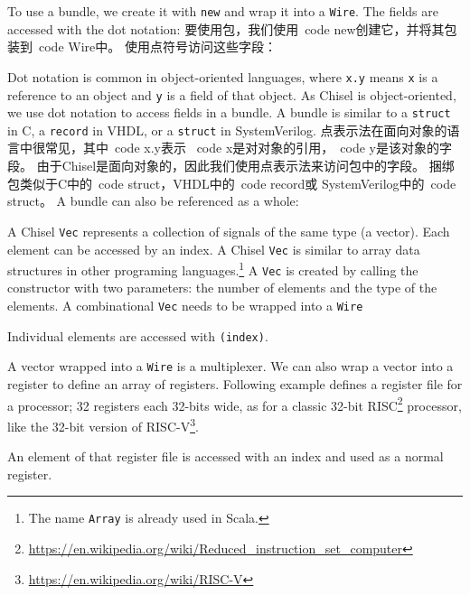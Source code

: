 \documentclass[%
    10pt,
    headinclude, footexclude,
    openright, %
    notitlepage,
    cleardoubleempty,
    headsepline,
    pointlessnumbers,
    bibtotoc, idxtotoc,
    ]{scrbook}
\newcommand{\code}[1]{{\small{\texttt{#1}}}}
\newcommand{\codefoot}[1]{{\footnotesize{\texttt{#1}}}}
\newcommand{\myref}[2]{\href{#1}{#2}}
\renewcommand{\myref}[2]{{#2}{\footnote{\url{#1}}}}
\begin{document}
\noindent To use a bundle, we create it with \code{new} and wrap it into a \code{Wire}.
The fields are accessed with the dot notation:
要使用包，我们使用\ code {new}创建它，并将其包装到\ code {Wire}中。
使用点符号访问这些字段：


Dot notation is common in object-oriented languages, where \code{x.y} means
\code{x} is a reference to an object and \code{y} is a field of that object.
As Chisel is object-oriented, we use dot notation to access fields in a bundle.
A bundle is similar to a \code{struct} in C, a \code{record} in VHDL, or a
\code{struct} in SystemVerilog.
点表示法在面向对象的语言中很常见，其中\ code {x.y}表示
\ code {x}是对对象的引用，\ code {y}是该对象的字段。
由于Chisel是面向对象的，因此我们使用点表示法来访问包中的字段。
捆绑包类似于C中的\ code {struct}，VHDL中的\ code {record}或
SystemVerilog中的\ code {struct}。
A bundle can also be referenced as a whole:


A Chisel \code{Vec} represents a collection of signals of the same type (a vector).
Each element can be accessed by an index. A Chisel \code{Vec} is similar
to array data structures in other programing languages.\footnote{The name \codefoot{Array}
is already used in Scala.}
A \code{Vec} is created by calling the constructor with two parameters: the
number of elements and the type of the elements. A combinational \code{Vec}
needs to be wrapped into a \code{Wire}


\noindent Individual elements are accessed with \code{(index)}.


A vector wrapped into a \code{Wire} is a multiplexer.
We can also wrap a vector into a register to define an array of registers.
Following example defines a register file for a processor; 32 registers
each 32-bits wide, as for a classic 32-bit 
\myref{https://en.wikipedia.org/wiki/Reduced_instruction_set_computer}{RISC}
processor, like the 32-bit version of \myref{https://en.wikipedia.org/wiki/RISC-V}{RISC-V}.


\noindent An element of that register file is accessed with an index and used as a normal register.

\end{document}
